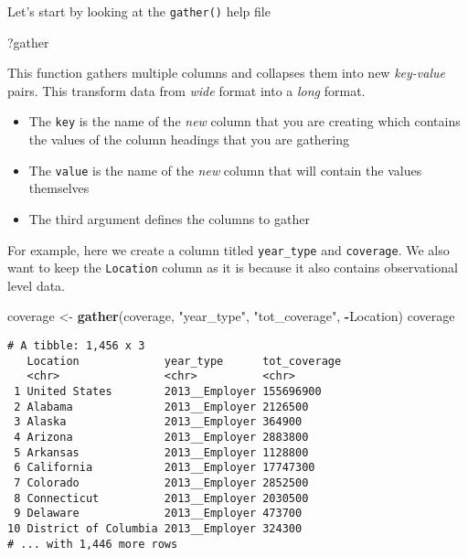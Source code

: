 \documentclass[]{article}
\newenvironment{Shaded}{\begin{snugshade}}{\end{snugshade}}
\newcommand{\KeywordTok}[1]{\textcolor[rgb]{0.13,0.29,0.53}{\textbf{#1}}}
\newcommand{\NormalTok}[1]{#1}
\newcommand{\OperatorTok}[1]{\textcolor[rgb]{0.81,0.36,0.00}{\textbf{#1}}}
\newcommand{\StringTok}[1]{\textcolor[rgb]{0.31,0.60,0.02}{#1}}
\providecommand{\tightlist}{%
  \setlength{\itemsep}{0pt}\setlength{\parskip}{0pt}}
\begin{document}
Let's start by looking at the \texttt{gather()} help file

\begin{Shaded}
\begin{Highlighting}[]
\NormalTok{?gather}
\end{Highlighting}
\end{Shaded}

This function gathers multiple columns and collapses them into new
\emph{key-value} pairs. This transform data from \emph{wide} format into
a \emph{long} format.

\begin{itemize}
\tightlist
\item
  The \texttt{key} is the name of the \emph{new} column that you are
  creating which contains the values of the column headings that you are
  gathering
\item
  The \texttt{value} is the name of the \emph{new} column that will
  contain the values themselves
\item
  The third argument defines the columns to gather
\end{itemize}

For example, here we create a column titled \texttt{year\_type} and
\texttt{coverage}. We also want to keep the \texttt{Location} column as
it is because it also contains observational level data.

\begin{Shaded}
\begin{Highlighting}[]
\NormalTok{coverage <-}\StringTok{ }\KeywordTok{gather}\NormalTok{(coverage, }\StringTok{"year_type"}\NormalTok{, }\StringTok{"tot_coverage"}\NormalTok{, }\OperatorTok{-}\NormalTok{Location)}
\NormalTok{coverage}
\end{Highlighting}
\end{Shaded}

\begin{verbatim}
# A tibble: 1,456 x 3
   Location             year_type      tot_coverage
   <chr>                <chr>          <chr>       
 1 United States        2013__Employer 155696900   
 2 Alabama              2013__Employer 2126500     
 3 Alaska               2013__Employer 364900      
 4 Arizona              2013__Employer 2883800     
 5 Arkansas             2013__Employer 1128800     
 6 California           2013__Employer 17747300    
 7 Colorado             2013__Employer 2852500     
 8 Connecticut          2013__Employer 2030500     
 9 Delaware             2013__Employer 473700      
10 District of Columbia 2013__Employer 324300      
# ... with 1,446 more rows
\end{verbatim}
\end{document}
